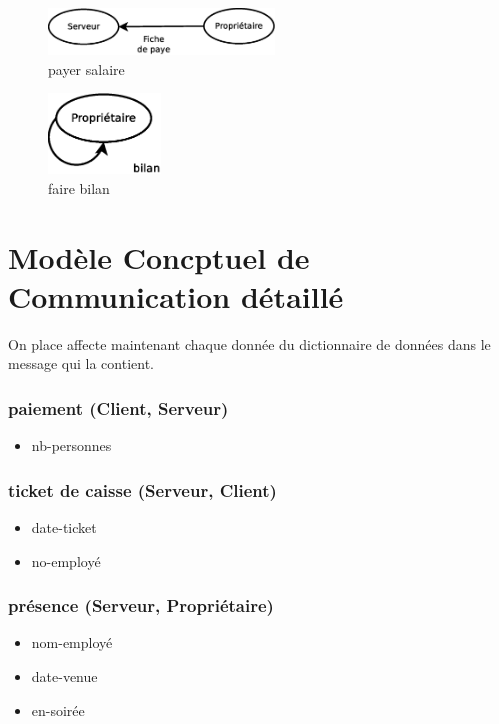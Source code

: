 \begin{figure}[!htb]
    \begin{center}
    \includegraphics[width=6cm]{images/cc1_mcc3.eps}
    \caption{\label{cc1_mcc3} payer salaire}
    \end{center}
\end{figure}

\begin{figure}[!htb]
    \begin{center}
    \includegraphics[width=3cm]{images/cc1_mcc4.eps}
    \caption{\label{cc1_mcc4} faire bilan}
    \end{center}
\end{figure}

\newpage
\section*{Modèle Concptuel de Communication détaillé}

On place affecte maintenant chaque donnée du dictionnaire de données dans le message qui la contient.

\subsubsection*{paiement (Client, Serveur)}
\begin{itemize}
    \item nb-personnes
\end{itemize}

\subsubsection*{ticket de caisse (Serveur, Client)}
\begin{itemize}
    \item date-ticket
    \item no-employé
\end{itemize}

\subsubsection*{présence (Serveur, Propriétaire)}
\begin{itemize}
    \item nom-employé
    \item date-venue
    \item en-soirée
\end{itemize}

